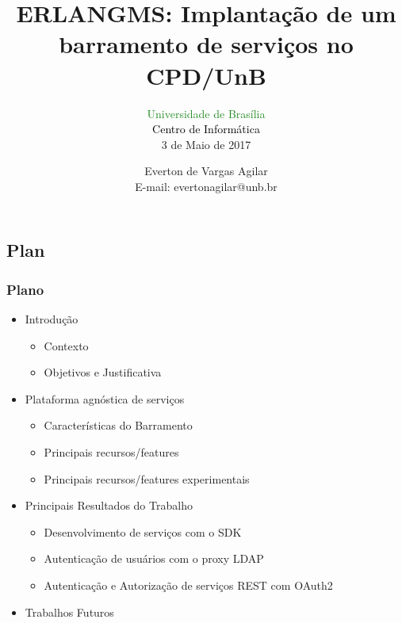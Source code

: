 \documentclass{beamer}
\title{ERLANGMS: Implantação de um barramento de serviços no CPD/UnB}
\subtitle{ \textcolor{forestgreen}{Universidade de Brasília} \\
			\textcolor{black}{Centro de Informática} \\
			3 de Maio de 2017
}
\author{Everton de Vargas Agilar \\
		E-mail: evertonagilar@unb.br
}
\begin{document}
\begin{frame}
  \titlepage
\end{frame}








\subsection{Plan}

\begin{frame}
  \frametitle{Plano}

    \begin{itemize}

	    \item<1-> Introdução
		    \begin{itemize}
		  	  \item<1->Contexto
		    	  \item<1->Objetivos e Justificativa
		     \end{itemize}

		 \item<1-> Plataforma agnóstica de serviços
		    \begin{itemize}
				\item<1->Características do Barramento
				\item<1->Principais recursos/features
				\item<1->Principais recursos/features experimentais
		     \end{itemize}

  	  	 \item<1-> Principais Resultados do Trabalho
		    \begin{itemize}
				\item<1->Desenvolvimento de serviços com o SDK
				\item<1->Autenticação de usuários com o proxy LDAP
				\item<1->Autenticação e Autorização de serviços REST com OAuth2
  		     \end{itemize}
  	  
	   	  \item<1-> Trabalhos Futuros
	   	  
    \end{itemize}

\end{frame}




\end{document}
